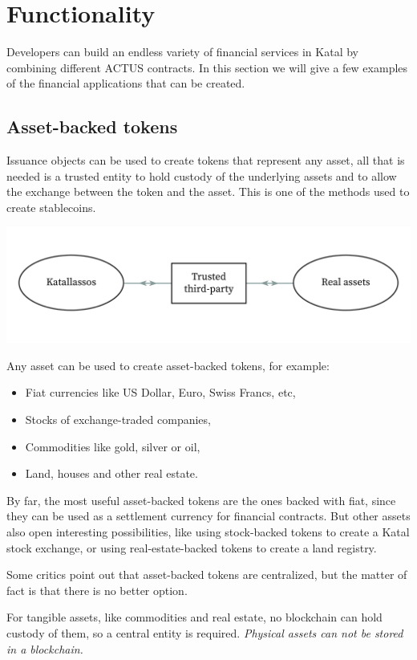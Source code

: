 \documentclass[conference]{IEEEtran}
\begin{document}
\section{Functionality}
Developers can build an endless variety of financial services in Katal by combining different ACTUS contracts. In this section we will give a few examples of the financial applications that can be created.

\subsection{Asset-backed tokens}
Issuance objects can be used to create tokens that represent any asset, all that is needed is a trusted entity to hold custody of the underlying assets and to allow the exchange between the token and the asset. This is one of the methods used to create stablecoins.

\includegraphics[width=\linewidth]{images/asset_backed.jpg}

Any asset can be used to create asset-backed tokens, for example:

\begin{itemize}
	\item Fiat currencies like US Dollar, Euro, Swiss Francs, etc,
	\item Stocks of exchange-traded companies,
	\item Commodities like gold, silver or oil,
	\item Land, houses and other real estate.
\end{itemize}

By far, the most useful asset-backed tokens are the ones backed with fiat, since they can be used as a settlement currency for financial contracts. But other assets also open interesting possibilities, like using stock-backed tokens to create a Katal stock exchange, or using real-estate-backed tokens to create a land registry.

Some critics point out that asset-backed tokens are centralized, but the matter of fact is that there is no better option.

For tangible assets, like commodities and real estate, no blockchain can hold custody of them, so a central entity is required. \textit{Physical assets can not be stored in a blockchain.}
\end{document}

